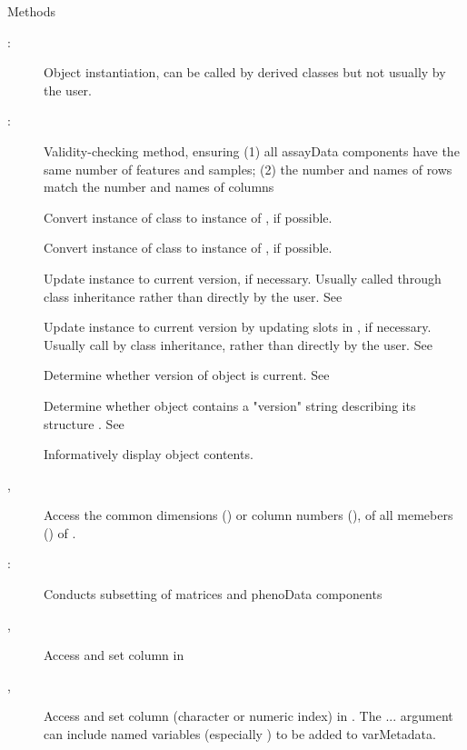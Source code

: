 \documentclass[letterpaper]{book}
\begin{document}
\begin{Section}{Methods}
\begin{description}
\end{description}

\begin{description}

\item[:] Object instantiation, can be called by
derived classes but not usually by the user.
\item[:] Validity-checking method,
ensuring (1) all assayData components have the same number of
features and samples; (2) the number and names of
 rows match the number and names of
 columns
\item[] Convert instance of class  to instance of , if possible.
\item[] Convert instance of class  to instance of , if possible.
\item[] Update instance to current version, if necessary. Usually called through class inheritance rather than directly by the user. See 
\item[] Update instance to current version by updating slots in , if necessary. Usually call by class inheritance, rather than directly by the user. See 
\item[] Determine whether version of object is current. See 
\item[] Determine whether object contains a "version" string describing its structure . See 
\item[] Informatively display object contents.
\item[, ] Access the common
dimensions () or column numbers (), of all
memebers () of .
\item[\code{object[(index)}:] Conducts subsetting of matrices and
phenoData components 
\item[, ] Access and set  column in 
\item[, ] Access and set column  (character or
numeric index) in . The ... argument can include
named variables (especially ) to be added
to varMetadata.


\end{description}
\end{Section}
\end{document}
